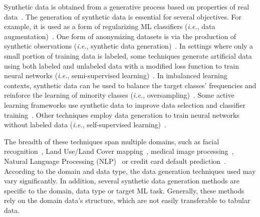 Synthetic data is obtained from a generative process based on properties of
real data~\cite{assefa2020generating}. The generation of synthetic data is
essential for several objectives. For example, it is used as a form of
regularizing ML classifiers (\textit{i.e.}, data
augmentation)~\cite{wang2021regularizing}. One form of anonymizing datasets is
via the production of synthetic observations (\textit{i.e.}, synthetic data
generation)~\cite{patki2016synthetic}. In settings where only a small portion
of training data is labeled, some techniques generate artificial data using
both labeled and unlabeled data with a modified loss function to train neural
networks (\textit{i.e.}, semi-supervised learning)~\cite{laine2017temporal}.
In imbalanced learning contexts, synthetic data can be used to balance the
target classes' frequencies and reinforce the learning of minority classes
(\textit{i.e.}, oversampling)~\cite{fonseca2021improving}. Some active
learning frameworks use synthetic data to improve data selection and
classifier training~\cite{kim2021lada}. Other techniques employ data
generation to train neural networks without labeled data (\textit{i.e.},
self-supervised learning)~\cite{grill2020bootstrap}.

The breadth of these techniques span multiple domains, such as facial
recognition~\cite{lv2017data}, Land Use/Land Cover
mapping~\cite{douzas2019imbalanced}, medical image
processing~\cite{yi2019generative}, Natural Language Processing
(NLP)~\cite{feng2021survey} or credit card default
prediction~\cite{alam2020investigation}. According to the domain and data
type, the data generation techniques used may vary significantly. In addition,
several synthetic data generation methods are specific to the domain, data
type or target ML task. Generally, these methods rely on the domain data's
structure, which are not easily transferable to tabular data.

